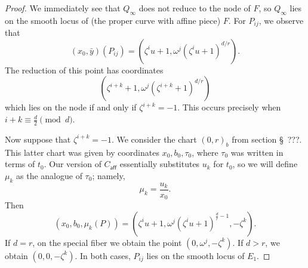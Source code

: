 \documentclass[pagesize,paper=letter]{scrartcl}
\theoremstyle{definition}
\theoremstyle{remark}
\def\caff{C_{\textsf{aff}}}
\begin{document}
\begin{proof}
  We immediately see that $Q_\infty$ does not reduce to the node of $F$, so $Q_\infty$ lies on the smooth locus of (the proper curve with affine piece) $F$. For $P_{ij}$, we observe that
  \[
  (x_0, \bar{y})(P_{ij}) = (\zeta^i u + 1, \omega^j (\zeta^i u + 1)^{d/r}).
  \]
  The reduction of this point has coordinates
  \[
  (\zeta^{i+k} + 1, \omega^j(\zeta^{i+k} + 1)^{d/r})
  \]
  which lies on the node if and only if $\zeta^{i+k} = -1$. This occurs precisely when $i + k \equiv \frac{d}{2} \pmod{d}$.

  Now suppose that $\zeta^{i+k} = -1$. We consider the chart $(0,r)_b$ from section \S~???. This latter chart was given by coordinates $x_0, b_0, \tau_0$, where $\tau_0$ was written in terms of $t_0$. Our version of $\caff$ essentially substitutes $u_k$ for $t_0$, so we will define $\mu_k$ as the analogue of $\tau_0$; namely,
  \[
  \mu_k = \frac{u_k}{x_0}.
  \]
  Then
  \[
  (x_0, b_0, \mu_k(P)) = (\zeta^iu + 1, \omega^j(\zeta^i u + 1)^{\frac{d}{r} - 1}, -\zeta^k).
  \]
  If $d = r$, on the special fiber we obtain the point $(0, \omega^j, -\zeta^k)$. If $d > r$, we obtain $(0, 0, -\zeta^k)$. In both cases, $P_{ij}$ lies on the smooth locus of $E_1$.
\end{proof}
\end{document}
